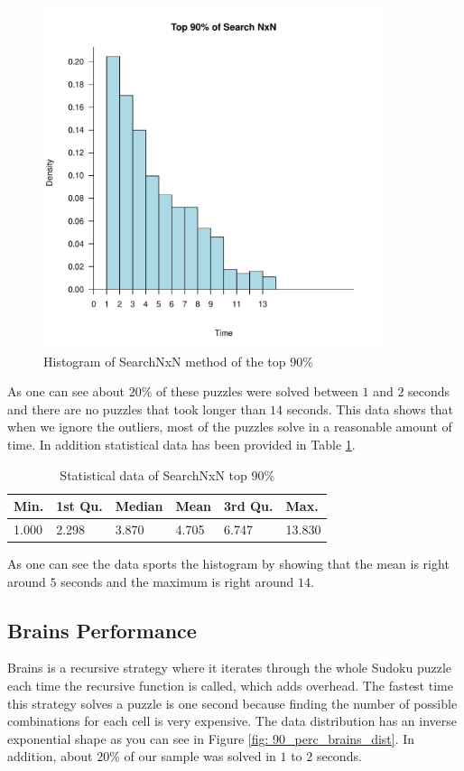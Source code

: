 \documentclass[letterpaper]{article}
\begin{document}
\begin{figure}[h]
	\centering
	\includegraphics[width=100mm]{../stats/Top90SearchNxN.pdf}
	\caption{Histogram of SearchNxN method of the top 90\%}
	\label{fig:search-time-complex-hist-90}
\end{figure}

As one can see about $20\%$ of these puzzles were solved between $1$ and $2$ seconds and there are no puzzles that took longer than $14$ seconds. This data shows that when we ignore the outliers, most of the puzzles solve in a reasonable amount of time. In addition statistical data has been provided in Table \ref{tab:SearchNxNTab2}.

\begin{table}[h]
\begin{tabular}{|l|l|l|l|l|l|}
\hline
Min. & 1st Qu.  & Median & Mean & 3rd Qu. & Max.\\
\hline
1.000 & 2.298 & 3.870 & 4.705 & 6.747 & 13.830\\
\hline
\end{tabular}
\caption{Statistical data of SearchNxN top 90\%}
\label{tab:SearchNxNTab2}
\end{table}

As one can see the data sports the histogram by showing that the mean is right around $5$ seconds and the maximum is right around $14$.

\subsection{Brains Performance}

Brains is a recursive strategy where it iterates through the whole Sudoku puzzle each time the recursive function is called, which adds overhead. The fastest time this strategy solves a puzzle is one second because finding the number of possible combinations for each cell is very expensive. The data distribution has an inverse exponential shape as you can see in Figure \ref{fig: 90_perc_brains_dist}. In addition, about $20\%$ of our sample was solved in $1$ to $2$ seconds.
\end{document}
